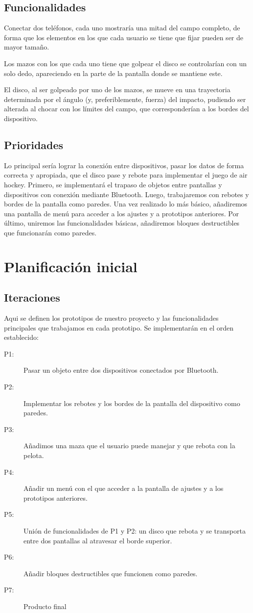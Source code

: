 \documentclass[a4paper,openright,12pt]{article}
\begin{document}
\subsection{Funcionalidades}
Conectar dos teléfonos, cada uno mostraría una mitad del campo completo, de forma que los elementos en los que cada usuario se tiene que fijar pueden ser de mayor tamaño.
 
Los mazos con los que cada uno tiene que golpear el disco se controlarían con un solo dedo, apareciendo en la parte de la pantalla donde se mantiene este.
 
El disco, al ser golpeado por uno de los mazos, se mueve en una trayectoria determinada por el ángulo (y, preferiblemente, fuerza) del impacto, pudiendo ser alterada al chocar con los límites del campo, que corresponderían a los bordes del dispositivo.
\subsection{Prioridades}
Lo principal sería lograr la conexión entre dispositivos, pasar los datos de forma correcta y apropiada, que el disco pase y rebote para implementar el juego de air hockey.
Primero, se implementará el trapaso de objetos entre pantallas y dispositivos con conexión mediante Bluetooth.
Luego, trabajaremos con rebotes y bordes de la pantalla como paredes.
Una vez realizado lo más básico, añadiremos una pantalla de menú para acceder a los ajustes y a prototipos anteriores. 
Por último, uniremos las funcionalidades básicas, añadiremos bloques destructibles que funcionarán como paredes.

\section{Planificación inicial}

\subsection{Iteraciones}
Aqui se definen los prototipos de nuestro proyecto y las funcionalidades principales que trabajamos en cada prototipo. Se implementarán en el orden establecido:
\begin{description}
\item[P1:] Pasar un objeto entre dos dispositivos conectados por Bluetooth.
\item[P2:] Implementar los rebotes y los bordes de la pantalla del dispositivo como paredes.
\item[P3:] Añadimos una maza que el usuario puede manejar y que rebota con la pelota.
\item[P4:] Añadir un menú con el que acceder a la pantalla de ajustes y a los prototipos anteriores.
\item[P5:] Unión de funcionalidades de P1 y P2: un disco que rebota y se transporta entre dos pantallas al atravesar el borde superior.
\item[P6:] Añadir bloques destructibles que funcionen como paredes.
\item[P7:] Producto final
\end{description}
\end{document}
